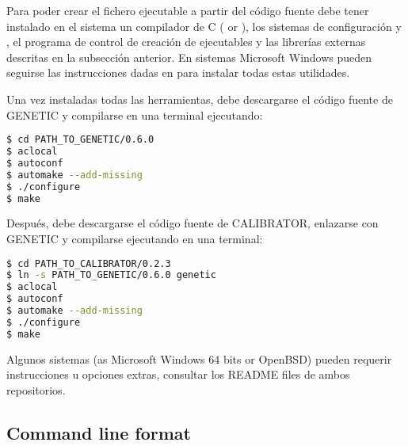 \documentclass[review,authoryear]{elsarticle}
\begin{document}
Para poder crear el fichero ejecutable a partir del código fuente debe tener
instalado en el sistema un compilador de C (\citet{gcc} or \citet{clang}), los
sistemas de configuración \citet{autoconf} y \citet{automake}, el programa de
control de creación de ejecutables \citet{gnumake} y las librerías externas
descritas en la subsección anterior. En sistemas Microsoft Windows pueden
seguirse las instrucciones dadas en \citet{mingw-make} para instalar todas estas
utilidades.

Una vez instaladas todas las herramientas, debe descargarse el código fuente de
GENETIC y compilarse en una terminal ejecutando:
\begin{lstlisting}[language=bash,basicstyle=\scriptsize]
$ cd PATH_TO_GENETIC/0.6.0
$ aclocal
$ autoconf
$ automake --add-missing
$ ./configure
$ make
\end{lstlisting}

Después, debe descargarse el código fuente de CALIBRATOR, enlazarse con GENETIC
y compilarse ejecutando en una terminal:
\begin{lstlisting}[language=bash,basicstyle=\scriptsize]
$ cd PATH_TO_CALIBRATOR/0.2.3
$ ln -s PATH_TO_GENETIC/0.6.0 genetic
$ aclocal
$ autoconf
$ automake --add-missing
$ ./configure
$ make
\end{lstlisting}

Algunos sistemas (as Microsoft Windows 64 bits or OpenBSD) pueden requerir
instrucciones u opciones extras, consultar los README files de ambos
repositorios.

\subsection{Command line format}
\end{document}
